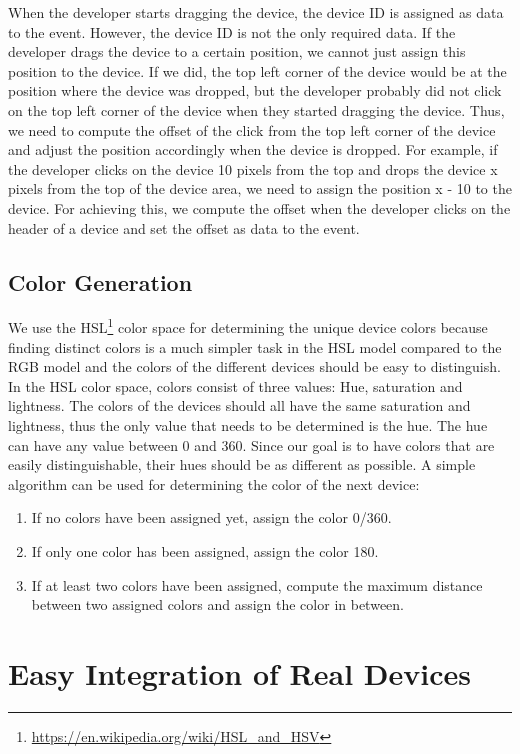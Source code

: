 When the developer starts dragging the device, the device ID is assigned as data to the event. However, the device ID is not the only required data. If the developer drags the device to a certain position, we cannot just assign this position to the device. If we did, the top left corner of the device would be at the position where the device was dropped, but the developer probably did not click on the top left corner of the device when they started dragging the device. Thus, we need to compute the offset of the click from the top left corner of the device and adjust the position accordingly when the device is dropped. For example, if the developer clicks on the device 10 pixels from the top and drops the device x pixels from the top of the device area, we need to assign the position x - 10 to the device. For achieving this, we compute the offset when the developer clicks on the header of a device and set the offset as data to the event.

\subsection{Color Generation}
We use the HSL\footnote{\url{https://en.wikipedia.org/wiki/HSL_and_HSV}} color space for determining the unique device colors because finding distinct colors is a much simpler task in the HSL model compared to the RGB model and the colors of the different devices should be easy to distinguish. In the HSL color space, colors consist of three values: Hue, saturation and lightness. The colors of the devices should all have the same saturation and lightness, thus the only value that needs to be determined is the hue. The hue can have any value between 0 and 360. Since our goal is to have colors that are easily distinguishable, their hues should be as different as possible. A simple algorithm can be used for determining the color of the next device:
\begin{enumerate}
	\item If no colors have been assigned yet, assign the color 0/360.
	\item If only one color has been assigned, assign the color 180.
	\item If at least two colors have been assigned, compute the maximum distance between two assigned colors and assign the color in between.
\end{enumerate}

\section{Easy Integration of Real Devices}

